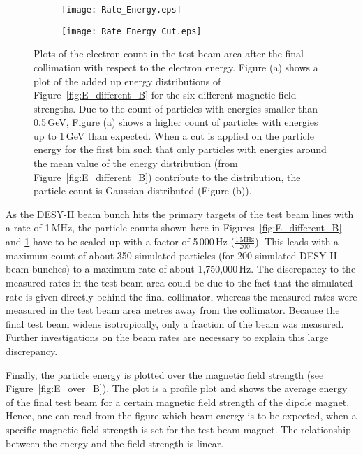 \begin{figure}
  \centering
  \begin{subfigure}[t]{0.49\textwidth}
    \texttt{[image: Rate\_Energy.eps]}
      \caption{}
  \end{subfigure}
\hfill
  \begin{subfigure}[t]{0.49\textwidth}
    \texttt{[image: Rate\_Energy\_Cut.eps]}
      \caption{}
  \end{subfigure}
 \caption[Plots of the test beam rate after the final collimation.]{Plots of the electron count in the test beam area after the final collimation with respect to the electron energy. Figure (a) shows a plot of the added up energy distributions of Figure~\ref{fig:E_different_B} for the six different magnetic field strengths. Due to the count of particles with energies smaller than 0.5\,GeV, Figure (a) shows a higher count of particles with energies up to 1\,GeV than expected. When a cut is applied on the particle energy for the first bin such that only particles with energies around the mean value of the energy distribution (from Figure~\ref{fig:E_different_B}) contribute to the distribution, the particle count is Gaussian distributed (Figure (b)).}
  \label{fig:TBCollimator_rate}
\end{figure}

As the DESY-II beam bunch hits the primary targets of the test beam lines with a 
rate of 1\,MHz, the particle counts shown here in 
Figures~\ref{fig:E_different_B} and \ref{fig:TBCollimator_rate} have to be 
scaled up with a factor of 5\,000\,Hz ($\frac{1\,\mathrm{MHz}}{200}$). This 
leads with a maximum count of about 350 simulated particles (for 200 simulated 
DESY-II beam bunches) to a maximum rate of about 1,750,000\,Hz. The discrepancy 
to the measured rates in the test beam area could be due to the fact that the 
simulated rate is given directly behind the final collimator, whereas the 
measured rates were measured in the test beam area metres away from the 
collimator. Because the final test beam widens isotropically, only a fraction of 
the beam was measured. Further investigations on the beam rates are necessary to 
explain this large discrepancy.

Finally, the particle energy is plotted over the magnetic field strength (see 
Figure~\ref{fig:E_over_B}). The plot is a profile plot and shows the average 
energy of the final test beam for a certain magnetic field strength of the 
dipole magnet. Hence, one can read from the figure which beam energy is to be 
expected, when a specific magnetic field strength is set for the test beam 
magnet. The relationship between the energy and the field strength is linear.

